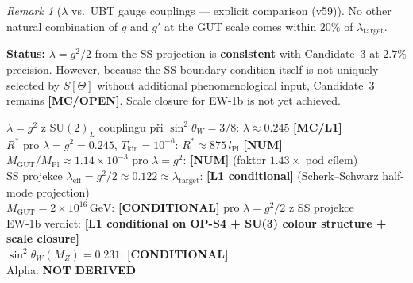 \documentclass[12pt,a4paper]{article}
\theoremstyle{remark}
\newtheorem{remark}{Remark}[section]
\begin{document}
\begin{remark}[$\lambda$ vs.\ UBT gauge couplings — explicit comparison (v59)]
No other natural combination of $g$ and $g'$ at the GUT scale comes within
$20\%$ of $\lambda_{\mathrm{target}}$.

\medskip
\noindent\textbf{Status:}
$\lambda = g^2/2$ from the SS projection is \textbf{consistent} with
Candidate~3 at $2.7\%$ precision.  However, because the SS boundary condition
itself is not uniquely selected by $S[\Theta]$ without additional
phenomenological input, Candidate~3 remains
\textbf{[MC/OPEN]}.  Scale closure for EW-1b is not yet achieved.
\end{remark}

\begin{statusbox}
$\lambda = g^2$ z $\mathrm{SU}(2)_L$ couplingu při $\sin^2\theta_W=3/8$:
  $\lambda\approx0.245$ \textbf{[MC/L1]}\\
$R^*$ pro $\lambda=g^2=0.245$, $T_{\mathrm{kin}}=10^{-6}$:
  $R^*\approx 875\,l_{\mathrm{Pl}}$ \textbf{[NUM]}\\
$M_{\mathrm{GUT}}/M_{\mathrm{Pl}}\approx 1.14\times10^{-3}$ pro $\lambda=g^2$:
  \textbf{[NUM]} (faktor $1.43\times$ pod cílem)\\
SS projekce $\lambda_{\mathrm{eff}}=g^2/2\approx0.122\approx\lambda_{\mathrm{target}}$:
  \textbf{[L1 conditional]} (Scherk--Schwarz half-mode projection)\\
$M_{\mathrm{GUT}} = 2\times10^{16}\,\mathrm{GeV}$:
  \textbf{[CONDITIONAL]} pro $\lambda=g^2/2$ z SS projekce\\
EW-1b verdict: \textbf{[L1 conditional on OP-S4 + SU(3) colour structure + scale closure]}\\
$\sin^2\theta_W(M_Z) = 0.231$: \textbf{[CONDITIONAL]}\\
Alpha: \textbf{NOT DERIVED}
\end{statusbox}
\end{document}
